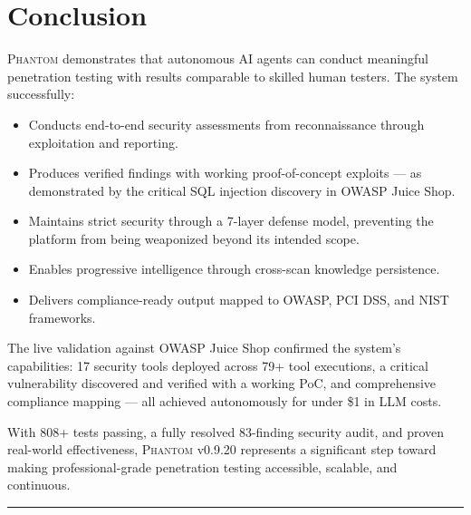 \documentclass[12pt,a4paper,twoside]{report}
\makeatletter
\newcommand{\phantom@}{\textsc{Phantom}}
\makeatother
\begin{document}
\chapter{Conclusion}
\label{ch:conclusion}

\phantom@{} demonstrates that autonomous AI agents can conduct meaningful penetration testing with results comparable to skilled human testers. The system successfully:

\begin{itemize}
    \item Conducts end-to-end security assessments from reconnaissance through exploitation and reporting.
    \item Produces verified findings with working proof-of-concept exploits --- as demonstrated by the critical SQL injection discovery in OWASP Juice Shop.
    \item Maintains strict security through a 7-layer defense model, preventing the platform from being weaponized beyond its intended scope.
    \item Enables progressive intelligence through cross-scan knowledge persistence.
    \item Delivers compliance-ready output mapped to OWASP, PCI DSS, and NIST frameworks.
\end{itemize}

The live validation against OWASP Juice Shop confirmed the system's capabilities: 17 security tools deployed across 79+ tool executions, a critical vulnerability discovered and verified with a working PoC, and comprehensive compliance mapping --- all achieved autonomously for under \$1 in LLM costs.

With 808+ tests passing, a fully resolved 83-finding security audit, and proven real-world effectiveness, \phantom@{} v0.9.20 represents a significant step toward making professional-grade penetration testing accessible, scalable, and continuous.

\vspace{1cm}
\begin{center}
\textcolor{phantom}{\rule{0.5\textwidth}{1pt}}
\end{center}
\end{document}
